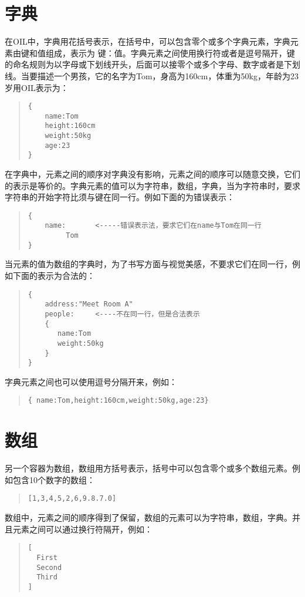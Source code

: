 \documentclass[a4paper]{article}
\begin{document}
\begin{CJK}{UTF8}{song}
\section{字典}
在OIL中，字典用花括号表示，在括号中，可以包含零个或多个字典元素，字典元素由键和值组成，表示为 键：值。字典元素之间使用换行符或者是逗号隔开，键的命名规则为以字母或下划线开头，后面可以接零个或多个字母、数字或者是下划线。当要描述一个男孩，它的名字为Tom，身高为160cm，体重为50kg，年龄为23岁用OIL表示为：
\begin{quote}
\begin{verbatim}
{
    name:Tom
    height:160cm
    weight:50kg
    age:23
}
\end{verbatim}
\end{quote}
在字典中，元素之间的顺序对字典没有影响，元素之间的顺序可以随意交换，它们的表示是等价的。字典元素的值可以为字符串，数组，字典，当为字符串时，要求字符串的开始字符比须与键在同一行。例如下面的为错误表示：
\begin{quote}
\begin{verbatim}
{
    name:       <-----错误表示法，要求它们在name与Tom在同一行
         Tom
}
\end{verbatim}
\end{quote}
当元素的值为数组的字典时，为了书写方面与视觉美感，不要求它们在同一行，例如下面的表示为合法的：
\begin{quote}
\begin{verbatim}
{
    address:"Meet Room A"
    people:     <----不在同一行，但是合法表示
    {          
       name:Tom
       weight:50kg
    }
}
\end{verbatim}
\end{quote}
字典元素之间也可以使用逗号分隔开来，例如：
\begin{quote}
\begin{verbatim}
{ name:Tom,height:160cm,weight:50kg,age:23}
\end{verbatim}
\end{quote}



\section{数组}
另一个容器为数组，数组用方括号表示，括号中可以包含零个或多个数组元素。例如包含10个数字的数组：
\begin{quote}
\begin{verbatim}
[1,3,4,5,2,6,9.8.7.0]
\end{verbatim}
\end{quote}
数组中，元素之间的顺序得到了保留，数组的元素可以为字符串，数组，字典。并且元素之间可以通过换行符隔开，例如：
\begin{quote}
\begin{verbatim}
[
  First
  Second
  Third
]
\end{verbatim}
\end{quote}


\end{CJK}
\end{document}
